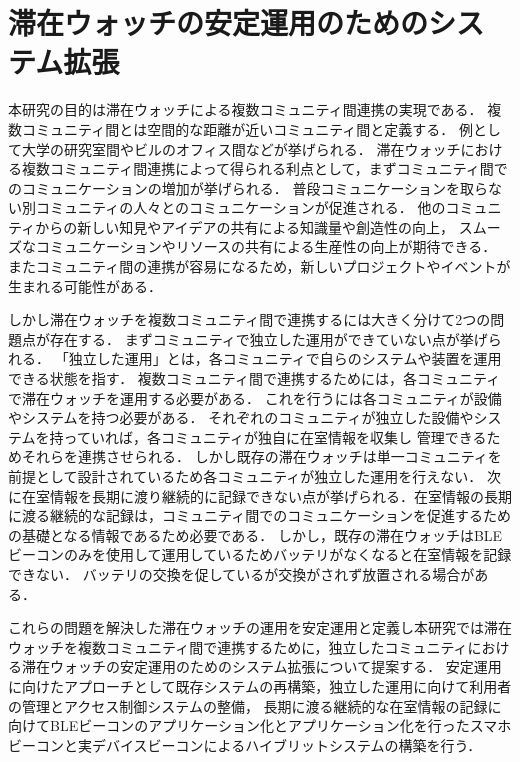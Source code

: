 \section{滞在ウォッチの安定運用のためのシステム拡張}\label{1.2}

本研究の目的は滞在ウォッチによる複数コミュニティ間連携の実現である．
複数コミュニティ間とは空間的な距離が近いコミュニティ間と定義する．
例として大学の研究室間やビルのオフィス間などが挙げられる．
滞在ウォッチにおける複数コミュニティ間連携によって得られる利点として，まずコミュニティ間でのコミュニケーションの増加が挙げられる．
普段コミュニケーションを取らない別コミュニティの人々とのコミュニケーションが促進される．
他のコミュニティからの新しい知見やアイデアの共有による知識量や創造性の向上，
スムーズなコミュニケーションやリソースの共有による生産性の向上が期待できる．
またコミュニティ間の連携が容易になるため，新しいプロジェクトやイベントが生まれる可能性がある．

しかし滞在ウォッチを複数コミュニティ間で連携するには大きく分けて2つの問題点が存在する．
まずコミュニティで独立した運用ができていない点が挙げられる．
「独立した運用」とは，各コミュニティで自らのシステムや装置を運用できる状態を指す．
複数コミュニティ間で連携するためには，各コミュニティで滞在ウォッチを運用する必要がある．
これを行うには各コミュニティが設備やシステムを持つ必要がある．
それぞれのコミュニティが独立した設備やシステムを持っていれば，各コミュニティが独自に在室情報を収集し
管理できるためそれらを連携させられる．
しかし既存の滞在ウォッチは単一コミュニティを前提として設計されているため各コミュニティが独立した運用を行えない．
次に在室情報を長期に渡り継続的に記録できない点が挙げられる．在室情報の長期に渡る継続的な記録は，コミュニティ間でのコミュニケーションを促進するための基礎となる情報であるため必要である．
しかし，既存の滞在ウォッチはBLEビーコンのみを使用して運用しているためバッテリがなくなると在室情報を記録できない．
バッテリの交換を促しているが交換がされず放置される場合がある．

これらの問題を解決した滞在ウォッチの運用を安定運用と定義し本研究では滞在ウォッチを複数コミュニティ間で連携するために，独立したコミュニティにおける滞在ウォッチの安定運用のためのシステム拡張について提案する．
安定運用に向けたアプローチとして既存システムの再構築，独立した運用に向けて利用者の管理とアクセス制御システムの整備，
長期に渡る継続的な在室情報の記録に向けてBLEビーコンのアプリケーション化とアプリケーション化を行ったスマホビーコンと実デバイスビーコンによるハイブリットシステムの構築を行う．





